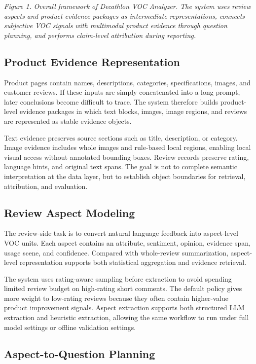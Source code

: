 \documentclass[11pt]{article}
\begin{document}
\emph{Figure 1. Overall framework of Decathlon VOC Analyzer. The system uses review aspects and product evidence packages as intermediate representations, connects subjective VOC signals with multimodal product evidence through question planning, and performs claim-level attribution during reporting.}

\subsection{Product Evidence Representation}

Product pages contain names, descriptions, categories, specifications, images, and customer reviews. If these inputs are simply concatenated into a long prompt, later conclusions become difficult to trace. The system therefore builds product-level evidence packages in which text blocks, images, image regions, and reviews are represented as stable evidence objects.

Text evidence preserves source sections such as title, description, or category. Image evidence includes whole images and rule-based local regions, enabling local visual access without annotated bounding boxes. Review records preserve rating, language hints, and original text spans. The goal is not to complete semantic interpretation at the data layer, but to establish object boundaries for retrieval, attribution, and evaluation.

\subsection{Review Aspect Modeling}

The review-side task is to convert natural language feedback into aspect-level VOC units. Each aspect contains an attribute, sentiment, opinion, evidence span, usage scene, and confidence. Compared with whole-review summarization, aspect-level representation supports both statistical aggregation and evidence retrieval.

The system uses rating-aware sampling before extraction to avoid spending limited review budget on high-rating short comments. The default policy gives more weight to low-rating reviews because they often contain higher-value product improvement signals. Aspect extraction supports both structured LLM extraction and heuristic extraction, allowing the same workflow to run under full model settings or offline validation settings.

\subsection{Aspect-to-Question Planning}
\end{document}
